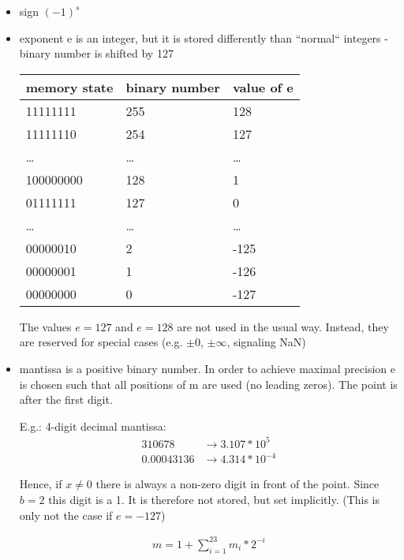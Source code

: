 \begin{itemize}
    \item sign $(-1)^s$
    \item exponent e is an integer, but it is stored differently than ``normal`` integers - binary number is shifted by 127

    \begin{tabular}{l l l}
        \toprule
        memory state & binary number & value of e \\
        \midrule
        11111111     & 255           & 128        \\
        11111110     & 254           & 127        \\
        \ldots       & \ldots        & \ldots     \\
        100000000    & 128           & 1          \\
        01111111     & 127           & 0          \\
        \ldots       & \ldots        & \ldots     \\
        00000010     & 2             & -125       \\
        00000001     & 1             & -126       \\
        00000000     & 0             & -127       \\
        \bottomrule
    \end{tabular}

    The values $e = 127$ and $e = 128$ are not used in the usual way.
    Instead, they are reserved for special cases (e.g. $\pm 0$, $ \pm \infty$, signaling NaN)
    \item mantissa is a positive binary number.
    In order to achieve maximal precision e is chosen such that all positions of m are used (no leading zeros).
    The point is after the first digit.

    E.g.: 4-digit decimal mantissa:
    \begin{align*}
        310678 &\rightarrow 3.107 * 10^5 \\
        0.00043136 &\rightarrow 4.314 * 10^{-4}
    \end{align*}

    Hence, if $x \neq 0$ there is always a non-zero digit in front of the point.
    Since $b = 2$ this digit is a 1.
    It is therefore not stored, but set implicitly.
    (This is only not the case if $e=-127$)

    \begin{align*}
        m = 1 + \sum_{i = 1}^{23} m_i * 2^{-i}
    \end{align*}
\end{itemize}

